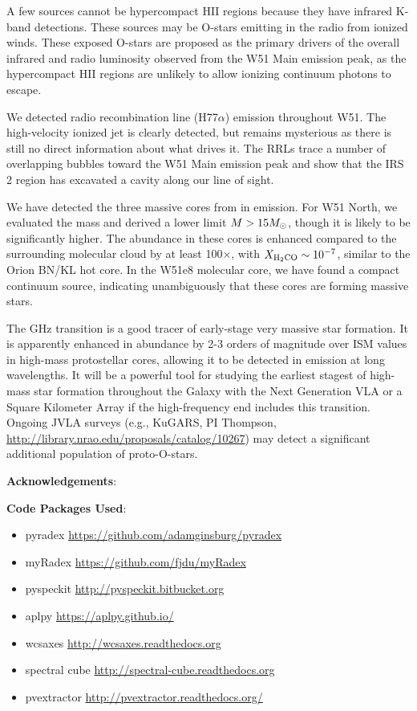 A few sources cannot be hypercompact HII regions because they have infrared
K-band detections.  These sources may be O-stars emitting in the radio from
ionized winds.  These exposed O-stars are proposed as the primary drivers of
the overall infrared and radio luminosity observed from the W51 Main emission
peak, as the hypercompact HII regions are unlikely to allow ionizing continuum
photons to escape.

We detected radio recombination line (H77$\alpha$) emission throughout W51.
The \citet{Lacy2007a} high-velocity ionized jet is clearly detected, but
remains mysterious as there is still no direct information about what drives
it.  The RRLs trace a number of overlapping bubbles toward the W51 Main
emission peak and show that the IRS 2 region has excavated a cavity along our
line of sight.

We have detected the three massive cores from \citet{Zhang1997a} in
\formaldehyde \twotwo emission.  For W51 North, we evaluated the mass and
derived a lower limit $M>15 M_{\odot}$, though it is likely to be significantly
higher.  The \formaldehyde abundance in these cores is enhanced compared to the
surrounding molecular cloud by at least 100$\times$, with $X_{\textrm{H}_2\textrm{CO}}
\sim 10^{-7}$, similar to the Orion BN/KL hot core.  In the W51e8 molecular
core, we have found a compact continuum source, indicating unambiguously that
these cores are forming massive stars.

The \formaldehyde {} GHz transition is a good tracer of early-stage
very massive star formation.  It is apparently enhanced in abundance by 2-3
orders of magnitude over ISM values in high-mass protostellar cores, allowing
it to be detected in emission at long wavelengths.  It will be a powerful tool
for studying the earliest stagest of high-mass star formation throughout the
Galaxy with the Next Generation VLA or a Square Kilometer Array if the
high-frequency end includes this transition.  Ongoing JVLA surveys (e.g.,
KuGARS, PI Thompson, \url{http://library.nrao.edu/proposals/catalog/10267}) may
detect a significant additional population of proto-O-stars.




\textbf{Acknowledgements}:

\textbf{Code Packages Used}:

\begin{itemize}
    \item pyradex \url{https://github.com/adamginsburg/pyradex}
    \item myRadex \url{https://github.com/fjdu/myRadex}
    \item pyspeckit \url{http://pyspeckit.bitbucket.org}
    \item aplpy \url{https://aplpy.github.io/}
    \item wcsaxes \url{http://wcsaxes.readthedocs.org}
    \item spectral cube \url{http://spectral-cube.readthedocs.org}
    \item pvextractor \url{http://pvextractor.readthedocs.org/}
\end{itemize}

